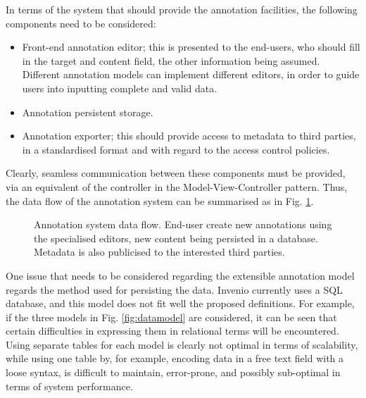 In terms of the system that should provide the annotation facilities, the
following components need to be considered:
\begin{itemize}
  \item Front-end annotation editor; this is presented to the end-users,
        who should fill in the target and content field, the other information
        being assumed. Different annotation models can implement different
        editors, in order to guide users into inputting complete and valid data.
  \item Annotation persistent storage.
  \item Annotation exporter; this should provide access to metadata to third
        parties, in a standardised format and with regard to the access control
        policies.
\end{itemize}
Clearly, seamless communication between these components must be provided, via
an equivalent of the controller in the Model-View-Controller pattern. Thus, the
data flow of the annotation system can be summarised as in Fig.
\ref{fig:dataflow}.

\begin{figure}[!ht]
  \centering
  \caption[Annotation system data flow]
          {Annotation system data flow. End-user create new annotations using
           the specialised editors, new content being persisted in a database.
           Metadata is also publicised to the interested third parties.}
  \label{fig:dataflow}
\end{figure}

One issue that needs to be considered regarding the extensible annotation model
regards the method used for persisting the data. Invenio currently uses a SQL
database, and this model does not fit well the proposed definitions. For
example, if the three models in Fig. \ref{fig:datamodel} are considered, it can
be seen that certain difficulties in expressing them in relational terms will
be encountered. Using separate tables for each model is clearly not optimal in
terms of scalability, while using one table by, for example, encoding data in a
free text field with a loose syntax, is difficult to maintain, error-prone, and
possibly sub-optimal in terms of system performance.

